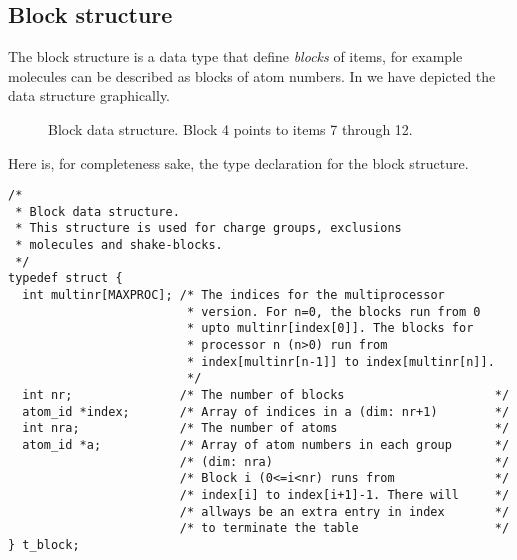 \subsection{Block structure}
The block structure is a data type that define {\em blocks} of items,
for example molecules can be described as blocks of atom numbers.
In  we have depicted the data structure graphically.
\begin{figure}
\centerline{}
\caption{Block data structure. Block 4 points to items 7 through 12.}
\label{fig:block}
\end{figure}

Here is, for completeness sake,
the type declaration for the block structure.
\begin{verbatim}
/*
 * Block data structure.
 * This structure is used for charge groups, exclusions
 * molecules and shake-blocks.
 */
typedef struct {
  int multinr[MAXPROC]; /* The indices for the multiprocessor 
                         * version. For n=0, the blocks run from 0
                         * upto multinr[index[0]]. The blocks for 
                         * processor n (n>0) run from 
                         * index[multinr[n-1]] to index[multinr[n]].
                         */
  int nr;               /* The number of blocks                     */
  atom_id *index;       /* Array of indices in a (dim: nr+1)        */
  int nra;              /* The number of atoms                      */
  atom_id *a;           /* Array of atom numbers in each group      */
                        /* (dim: nra)                               */
                        /* Block i (0<=i<nr) runs from              */
                        /* index[i] to index[i+1]-1. There will     */
                        /* allways be an extra entry in index       */
                        /* to terminate the table                   */
} t_block;
\end{verbatim}



